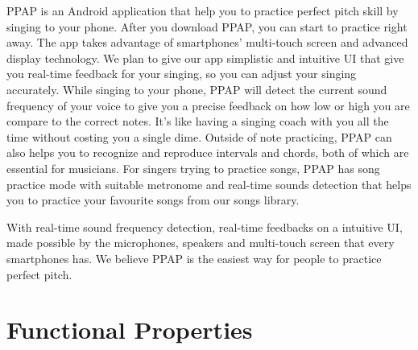 \documentclass{article}
\begin{document}
\qquad

		PPAP is an Android application that help you to practice perfect pitch skill by singing to your phone.
		After you download PPAP, you can start to practice right away. 
		The app takes advantage of smartphones’ multi-touch screen and advanced display technology. 
		We plan to give our app simplistic and intuitive UI that give you real-time feedback for your singing, so you can adjust your singing accurately. 
		While singing to your phone, PPAP will detect the current sound frequency of your voice to give you a precise feedback on how low or high you are compare to the correct notes. 
		It’s like having a singing coach with you all the time without costing you a single dime. 
		Outside of note practicing, PPAP can also helps you to recognize and reproduce intervals and chords, both of which are essential for musicians. 
		For singers trying to practice songs, PPAP has song practice mode with suitable metronome and real-time sounds detection that helps you to practice your favourite songs from our songs library.

\qquad

		With real-time sound frequency detection, real-time feedbacks on a intuitive UI, made possible by the microphones, speakers and multi-touch screen that every smartphones has. We believe PPAP is the easiest way for people to practice perfect pitch.

\section{Functional Properties}
\label{sec:function_properties}
\end{document}
